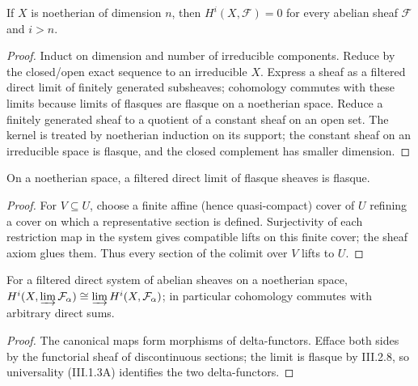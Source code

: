 \begin{theorem}
\label{ha-ch3-thm-grothendieck-vanishing}
If $X$ is noetherian of dimension $n$, then $H^i(X,\mathcal F)=0$ for every
abelian sheaf $\mathcal F$ and $i>n$.

\end{theorem}
\begin{proof}

Induct on dimension and number of irreducible components.  Reduce by the
closed/open exact sequence to an irreducible $X$.  Express a sheaf as a
filtered direct limit of finitely generated subsheaves; cohomology commutes
with these limits because limits of flasques are flasque on a noetherian
space.  Reduce a finitely generated sheaf to a quotient of a constant sheaf
on an open set.  The kernel is treated by noetherian induction on its support;
the constant sheaf on an irreducible space is flasque, and the closed
complement has smaller dimension.

\end{proof}
\begin{lemma}
\label{ha-ch3-lem-limits-flasque}
On a noetherian space, a filtered direct limit of flasque sheaves is flasque.

\end{lemma}
\begin{proof}

For $V\subseteq U$, choose a finite affine (hence quasi-compact) cover of $U$ refining a cover on
which a representative section is defined.  Surjectivity of each restriction map in the system gives
compatible lifts on this finite cover; the sheaf axiom glues them.  Thus every section of the colimit
over $V$ lifts to $U$.

\end{proof}
\begin{proposition}
\label{ha-ch3-prop-cohomology-direct-limits}
For a filtered direct system of abelian sheaves on a noetherian space,
$H^i(X,\varinjlim\mathcal F_\alpha)\cong\varinjlim H^i(X,\mathcal F_\alpha)$;
in particular cohomology commutes with arbitrary direct sums.

\end{proposition}
\begin{proof}

The canonical maps form morphisms of delta-functors.  Efface both sides by
the functorial sheaf of discontinuous sections; the limit is flasque by
III.2.8, so universality (III.1.3A) identifies the two delta-functors.

\end{proof}
